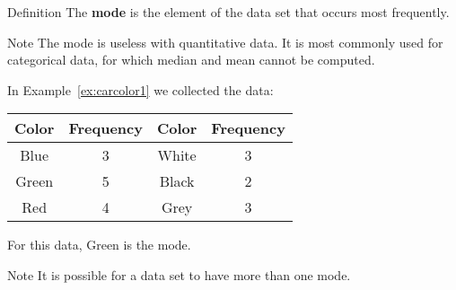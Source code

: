 \documentclass{beamer}
\begin{document}
\begin{frame}
\begin{block}{Definition}
The \textbf{mode} is the element of the data set that occurs most frequently.
\end{block}\pause

\begin{block}{Note}
The mode is useless with quantitative data. It is most commonly used for categorical data, for which median and mean cannot be computed. 
\end{block}\pause

\begin{example}
In Example~\ref{ex:carcolor1} we collected the data:

\vspace{-2mm}
\begin{center}
\begin{tabular}{|c|c||c|c|}
\hline
\textbf{Color} & \textbf{Frequency} & \textbf{Color} & \textbf{Frequency} \\\hline
Blue & 3 & White & 3\\\hline
Green & 5 & Black & 2\\\hline
Red & 4 & Grey & 3\\\hline
\end{tabular}
\end{center}

\vspace{-2mm}
For this data, Green is the mode.
\end{example}\pause

\begin{block}{Note}
It is possible for a data set to have more than one mode.
\end{block}
\end{frame}
\end{document}
